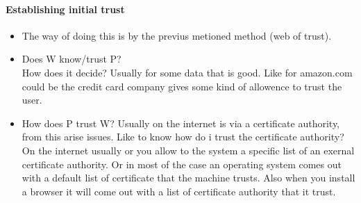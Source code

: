 \documentclass{article}
\begin{document}
        \paragraph{Establishing initial trust}
          \begin{itemize}
            \item The way of doing this is by the previus metioned method (web of trust).  
            \item Does W know/trust P? \\ How does it decide? Usually for some data that is good.
              Like for amazon.com could be the credit card company gives some kind of allowence 
              to trust the user. 
            \item How does P trust W? Usually on the internet is via a certificate authority, from 
              this arise issues. Like to know how do i trust the certificate authority? On the 
              internet usually or you allow to the system a specific list of an exernal certificate
              authority. Or in most of the case an operating system comes out with a default list of 
              certificate that the machine trusts. Also when you install a browser it will come out
              with a list of certificate authority that it trust.
          \end{itemize}
\end{document}
